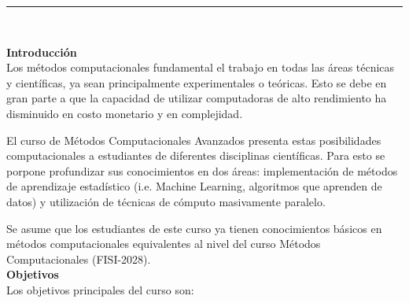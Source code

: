 \documentclass[letterpaper,10pt,onecolumn]{article}
\begin{document}



\noindent\rule{\textwidth}{1pt}\\[-0.1cm]

\addtocounter{mysection}{1}

\noindent\textbf{\large {} \quad Introducci\'on}\\[-0.2cm]


\noindent\normalsize Los m\'etodos computacionales fundamental el
trabajo en todas las \'areas t\'ecnicas y cient\'ificas,
ya sean principalmente experimentales o te\'oricas. Esto se debe en
gran parte a que la capacidad de utilizar computadoras de alto
rendimiento ha disminuido en costo monetario y en complejidad.

El curso de M\'etodos Computacionales Avanzados presenta estas
posibilidades computacionales a estudiantes de diferentes disciplinas
cient\'ificas. Para esto se porpone profundizar sus conocimientos
en dos \'areas: implementaci\'on de m\'etodos de aprendizaje estadístico (i.e. Machine Learning, algoritmos que aprenden de datos) y utilizaci\'on de t\'ecnicas de c\'omputo
masivamente paralelo.

Se asume que los estudiantes de este curso ya tienen conocimientos
b\'asicos en m\'etodos computacionales equivalentes al nivel del curso
M\'etodos Computacionales (FISI-2028). 
\\[0.1cm]

\noindent\textbf{\large {} \quad Objetivos}\\[-0.2cm]

\noindent\normalsize Los objetivos principales del curso son:
\end{document}
